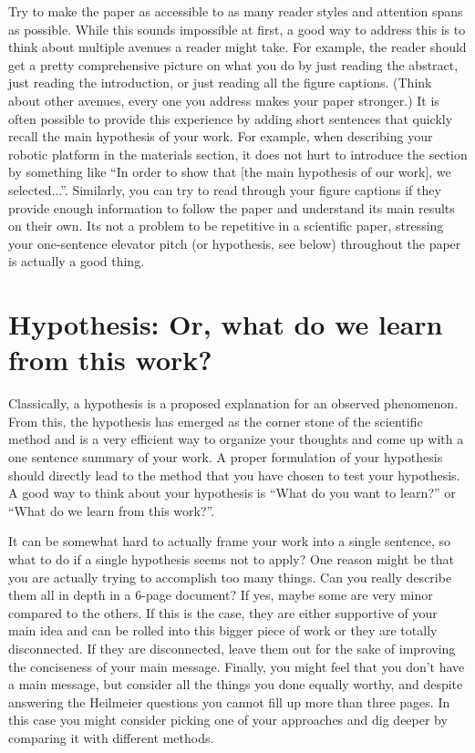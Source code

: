 \documentclass[paper=6.14in:9.21in,pagesize=pdftex,11pt,twoside,openright]{scrbook}
\begin{document}
Try to make the paper as accessible to as many reader styles and attention spans as possible. While this sounds impossible at first, a good way to address this is to think about multiple avenues a reader might take. For example, the reader should get a pretty comprehensive picture on what you do by just reading the abstract, just reading the introduction, or just reading all the figure captions. (Think about other avenues, every one you address makes your paper stronger.) It is often possible to provide this experience by adding short sentences  that quickly recall the main hypothesis of your work. For example, when describing your robotic platform in the materials section, it does not hurt to introduce the section by something like ``In order to show that [the main hypothesis of our work], we selected...''. Similarly, you can try to read through your figure captions if they provide enough information to follow the paper and understand its main results on their own. Its not a problem to be repetitive in a scientific paper, stressing your one-sentence elevator pitch (or hypothesis, see below) throughout the paper is actually a good thing.

\section{Hypothesis: Or, what do we learn from this work?}
Classically, a hypothesis is a proposed explanation for an observed phenomenon. From this, the hypothesis has emerged as the corner stone of the scientific method and is a very efficient way to organize your thoughts and come up with a one sentence summary of your work. A proper formulation of your hypothesis should directly lead to the method that you have chosen to test your hypothesis. A good way to think about your hypothesis is ``What do you want to learn?'' or ``What do we learn from this work?''.

It can be somewhat hard to actually frame your work into a single sentence, so what to do if a single hypothesis seems not to apply? One reason might be that you are actually trying to accomplish too many things. Can you really describe them all in depth in a 6-page document? If yes, maybe some are very minor compared to the others.  If this is the case, they are either supportive of your main idea and can be rolled into this bigger piece of work or they are totally disconnected. If they are disconnected, leave them out for the sake of improving the conciseness of your main message. Finally, you might feel that you don't have a main message, but consider all the things you done equally worthy, and despite answering the Heilmeier questions you cannot fill up more than three pages. In this case you might consider picking one of your approaches and dig deeper by comparing it with different methods.
\end{document}
